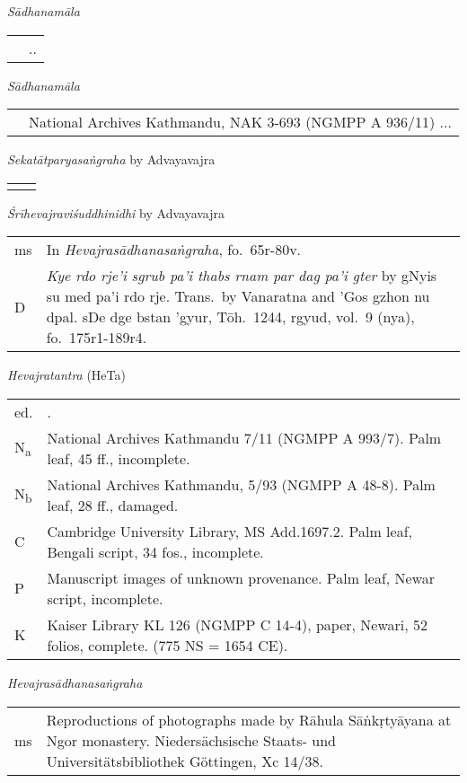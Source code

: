 \documentclass[12pt,twoside]{article}
\newcommand{\mybibexclude}[1]{\addtocategory{fullcited}{#1}}
\begin{document}
\noindent\emph{Sādhanamāla} 
\noindent\begin{longtable}{ p{} p{} }
	& \fullcite*{bhattacharyya1925}.\mybibexclude{bhattacharyya1925}.
\end{longtable}

\noindent\emph{Sādhanamāla} 
\noindent\begin{longtable}{ p{} p{} }
	& National Archives Kathmandu, NAK 3-693 (NGMPP A 936/11) ... 
\end{longtable}

\noindent\emph{Sekatātparyasaṅgraha} by Advayavajra
\noindent\begin{longtable}{ p{} p{} }
	& \cite[403–414]{mathes2015} 
\end{longtable}

\noindent\emph{Śrīhevajraviśuddhinidhi} by Advayavajra
\noindent\begin{longtable}{ p{} p{} }
	ms & In \emph{Hevajrasādhanasaṅgraha}, fo.\ 65r-80v. \\
	D & \emph{Kye rdo rje'i sgrub pa'i thabs rnam par dag pa'i gter} by gNyis su med pa'i rdo rje. Trans.\ by Vanaratna and 'Gos gzhon nu dpal. sDe dge bstan 'gyur, Tōh.\ 1244, rgyud, vol.\ 9 (nya), fo.\ 175r1-189r4. 
\end{longtable}

\noindent\emph{Hevajratantra} (HeTa) 
\noindent\begin{longtable}{ p{} p{} }
	ed. & \fullcite*{snellgrove1959}.\mybibexclude{snellgrove1959} \\
	N\textsubscript{a} & National Archives Kathmandu 7/11 (NGMPP A 993/7). Palm leaf, 45 ff., incomplete. \\
	N\textsubscript{b} & National Archives Kathmandu, 5/93 (NGMPP A 48-8). Palm leaf, 28 ff., damaged. \\
	C & Cambridge University Library, MS Add.1697.2. Palm leaf, Bengali script, 34 fos., incomplete. \\
	P & Manuscript images of unknown provenance. Palm leaf, Newar script, incomplete. \\
	K & Kaiser Library KL 126 (NGMPP C 14-4), paper, Newari, 52 folios, complete. (775 NS = 1654 CE). 
\end{longtable}

\noindent\emph{Hevajrasādhanasaṅgraha}
\noindent\begin{longtable}{ p{} p{} }
	ms & Reproductions of photographs made by Rāhula Sāṅkṛtyāyana at Ngor monastery. Niedersächsische Staats- und Universitätsbibliothek Göttingen, Xc 14/38. 
\end{longtable}
\end{document}
